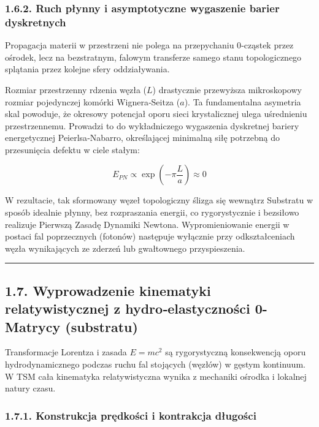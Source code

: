 \documentclass[
  letterpaper,
  DIV=11,
  numbers=noendperiod]{scrartcl}
\numberwithin{equation}{subsection}
\begin{document}
\subsubsection{1.6.2. Ruch płynny i asymptotyczne wygaszenie barier
dyskretnych}\label{ruch-pux142ynny-i-asymptotyczne-wygaszenie-barier-dyskretnych}

Propagacja materii w przestrzeni nie polega na przepychaniu 0‑cząstek
przez ośrodek, lecz na bezstratnym, falowym transferze samego stanu
topologicznego splątania przez kolejne sfery oddziaływania.

Rozmiar przestrzenny rdzenia węzła (\(L\)) drastycznie przewyższa
mikroskopowy rozmiar pojedynczej komórki Wignera‑Seitza (\(a\)). Ta
fundamentalna asymetria skal powoduje, że okresowy potencjał oporu sieci
krystalicznej ulega uśrednieniu przestrzennemu. Prowadzi to do
wykładniczego wygaszenia dyskretnej bariery energetycznej
Peierlsa‑Nabarro, określającej minimalną siłę potrzebną do przesunięcia
defektu w ciele stałym:

\[E_{PN} \propto \exp\left(-\pi \frac{L}{a}\right) \approx 0 \tag{1.6.1}\]

W rezultacie, tak sformowany węzeł topologiczny ślizga się wewnątrz
Substratu w sposób idealnie płynny, bez rozpraszania energii, co
rygorystycznie i bezsiłowo realizuje Pierwszą Zasadę Dynamiki Newtona.
Wypromieniowanie energii w postaci fal poprzecznych (fotonów) następuje
wyłącznie przy odkształceniach węzła wynikających ze zderzeń lub
gwałtownego przyspieszenia.

\begin{center}\rule{0.5\linewidth}{0.5pt}\end{center}

\subsection{1.7. Wyprowadzenie kinematyki relatywistycznej z
hydro‑elastyczności 0-Matrycy
(substratu)}\label{wyprowadzenie-kinematyki-relatywistycznej-z-hydroelastycznoux15bci-0-matrycy-substratu}

Transformacje Lorentza i zasada \(E = mc^2\) są rygorystyczną
konsekwencją oporu hydrodynamicznego podczas ruchu fal stojących
(węzłów) w gęstym kontinuum. W TSM cała kinematyka relatywistyczna
wynika z mechaniki ośrodka i lokalnej natury czasu.

\subsubsection{1.7.1. Konstrukcja prędkości i kontrakcja
długości}\label{konstrukcja-prux119dkoux15bci-i-kontrakcja-dux142ugoux15bci}
\end{document}
